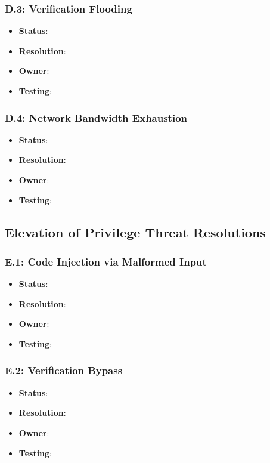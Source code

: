 \documentclass[../veristore_security_model.tex]{subfiles}
\begin{document}
\subsubsection{D.3: Verification Flooding}
\begin{itemize}
\item \textbf{Status}: %
\item \textbf{Resolution}: %
\item \textbf{Owner}: %
\item \textbf{Testing}: %
\end{itemize}

\subsubsection{D.4: Network Bandwidth Exhaustion}
\begin{itemize}
\item \textbf{Status}: %
\item \textbf{Resolution}: %
\item \textbf{Owner}: %
\item \textbf{Testing}: %
\end{itemize}

\subsection{Elevation of Privilege Threat Resolutions}

\subsubsection{E.1: Code Injection via Malformed Input}
\begin{itemize}
\item \textbf{Status}: %
\item \textbf{Resolution}: %
\item \textbf{Owner}: %
\item \textbf{Testing}: %
\end{itemize}

\subsubsection{E.2: Verification Bypass}
\begin{itemize}
\item \textbf{Status}: %
\item \textbf{Resolution}: %
\item \textbf{Owner}: %
\item \textbf{Testing}: %
\end{itemize}
\end{document}
